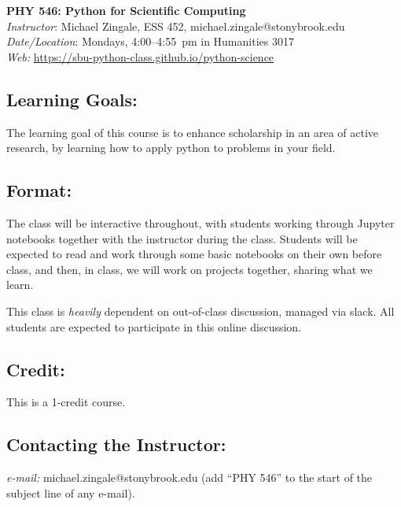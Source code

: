 \documentclass[10pt]{article}
\begin{document}
\begin{center}
{\LARGE \sffamily \bfseries PHY 546: Python for Scientific Computing} \\[3mm]
{\em Instructor}\/: Michael Zingale, ESS 452, michael.zingale@stonybrook.edu \\
{\em Date/Location}\/: Mondays, 4:00--4:55~pm in Humanities 3017 \\
{\em Web:}\/ {\small \url{https://sbu-python-class.github.io/python-science}}
\end{center}

\subsection*{Learning Goals:}

The learning goal of this course is to enhance scholarship in an area
of active research, by learning how to apply python to problems
in your field.


\subsection*{Format:}

The class will be interactive throughout, with students working
through Jupyter notebooks together with the instructor during the
class.  Students will be expected to read and work through some basic
notebooks on their own before class, and then, in class, we will work
on projects together, sharing what we learn.

This class is {\em heavily} dependent on out-of-class discussion,
managed via slack.  All students are expected to participate in this
online discussion.

\subsection*{Credit:}

This is a 1-credit course.


\subsection*{Contacting the Instructor:}

{\em e-mail:} michael.zingale@stonybrook.edu ({add ``PHY 546'' to the
 start of the subject line of any e-mail}).
%
\end{document}
